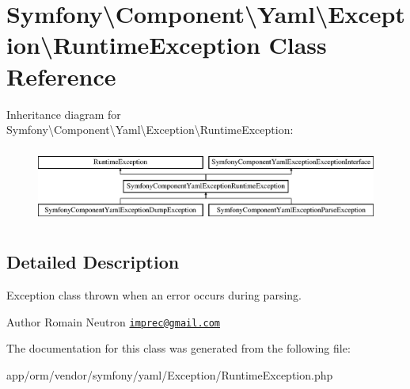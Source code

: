 \hypertarget{classSymfony_1_1Component_1_1Yaml_1_1Exception_1_1RuntimeException}{}\section{Symfony\textbackslash{}Component\textbackslash{}Yaml\textbackslash{}Exception\textbackslash{}Runtime\+Exception Class Reference}
\label{classSymfony_1_1Component_1_1Yaml_1_1Exception_1_1RuntimeException}
Inheritance diagram for Symfony\textbackslash{}Component\textbackslash{}Yaml\textbackslash{}Exception\textbackslash{}Runtime\+Exception\+:\begin{figure}[H]
\begin{center}
\leavevmode
\includegraphics[height=2.500000cm]{classSymfony_1_1Component_1_1Yaml_1_1Exception_1_1RuntimeException}
\end{center}
\end{figure}


\subsection{Detailed Description}
Exception class thrown when an error occurs during parsing.

\begin{DoxyAuthor}{Author}
Romain Neutron \href{mailto:imprec@gmail.com}{\tt imprec@gmail.\+com} 
\end{DoxyAuthor}


The documentation for this class was generated from the following file\+:\begin{DoxyCompactItemize}
\item 
app/orm/vendor/symfony/yaml/\+Exception/Runtime\+Exception.\+php\end{DoxyCompactItemize}
